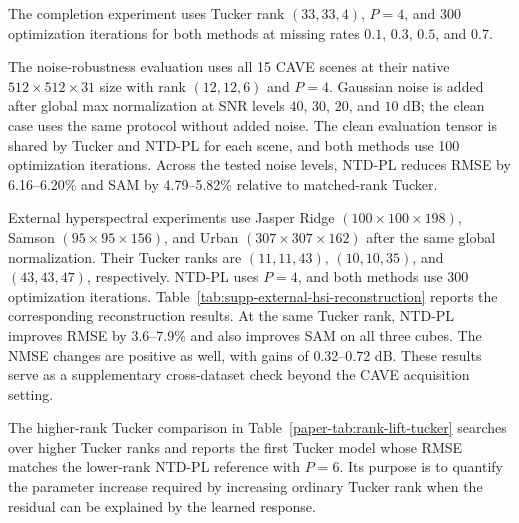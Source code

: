 The completion experiment uses Tucker rank \((33,33,4)\), \(P=4\), and 300
optimization iterations for both methods at missing rates \(0.1\), \(0.3\),
\(0.5\), and \(0.7\).

The noise-robustness evaluation uses all 15 CAVE scenes at their native
$512\times512\times31$ size with rank $(12,12,6)$ and \(P=4\). Gaussian noise is added
after global max normalization at SNR levels $40$, $30$, $20$, and $10$ dB;
the clean case uses the same protocol without added noise. The clean evaluation
tensor is shared by Tucker and NTD-PL for each scene, and both methods use 100
optimization iterations. Across the tested noise levels, NTD-PL reduces RMSE
by 6.16--6.20\% and SAM by 4.79--5.82\% relative to matched-rank Tucker.

\begin{table}[!t]
  \centering
  \caption{CAVE reconstruction with observation noise over all 15
  scenes. Models are fitted to clean or noisy tensors, and metrics are computed
  against the clean tensor; gains are relative error reductions over
  matched-rank Tucker.}
  \label{tab:supp-cave-noise-robustness}
  \scriptsize
  
\end{table}

External hyperspectral experiments use Jasper Ridge
\((100\times100\times198)\), Samson \((95\times95\times156)\), and Urban
\((307\times307\times162)\) after the same global normalization. Their Tucker
ranks are \((11,11,43)\), \((10,10,35)\), and \((43,43,47)\), respectively.
NTD-PL uses \(P=4\), and both methods use 300 optimization iterations.
Table~\ref{tab:supp-external-hsi-reconstruction} reports the
corresponding reconstruction results. At the same Tucker rank, NTD-PL
improves RMSE by 3.6--7.9\% and also improves SAM on all three cubes. The NMSE
changes are positive as well, with gains of 0.32--0.72 dB. These results serve
as a supplementary cross-dataset check beyond the CAVE acquisition setting.

\begin{table}[!t]
  \centering
  \caption{External hyperspectral reconstruction. NTD-PL uses the same Tucker
  rank as the Tucker baseline and adds only the polynomial response
  coefficients.}
  \label{tab:supp-external-hsi-reconstruction}
  \scriptsize
  \resizebox{\linewidth}{!}{}
\end{table}

The higher-rank Tucker comparison in Table~\ref{paper-tab:rank-lift-tucker} searches over
higher Tucker ranks and reports the first Tucker model whose RMSE matches the
lower-rank NTD-PL reference with \(P=6\). Its purpose is to quantify the parameter increase
required by increasing ordinary Tucker rank when the residual can be explained
by the learned response.

